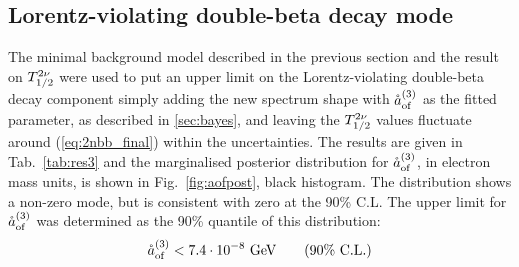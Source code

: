 \subsection*{Lorentz-violating double-beta decay mode}
The minimal background model described in the previous section and the result on $T_{1/2}^{2\nu}$ were used to put an upper limit on the Lorentz-violating double-beta decay component simply adding the new spectrum shape with $\mathring{a}_\text{of}^{(3)}$ as the fitted parameter, as described in \ref{sec:bayes}, and leaving the $T_{1/2}^{2\nu}$ values fluctuate around (\ref{eq:2nbb_final}) within the uncertainties. The results are given in Tab.~\ref{tab:res3} and the marginalised posterior distribution for $\mathring{a}_\text{of}^{(3)}$, in electron mass units, is shown in Fig.~\ref{fig:aofpost}, black histogram. The distribution shows a non-zero mode, but is consistent with zero at the 90\% C.L. The upper limit for $\mathring{a}_\text{of}^{(3)}$ was determined as the 90\% quantile of this distribution:
\begin{equation}\mathring{a}_\text{of}^{(3)}<7.4\cdot10^{-8}\ \text{GeV}\qquad(\text{90\% C.L.})\label{eq:aoflimit}\end{equation}

